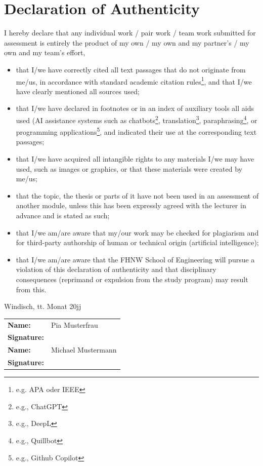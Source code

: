 \section*{Declaration of Authenticity}


I hereby declare that any individual work / pair work / team work submitted for assessment is entirely the product of my own / my own and my partner’s / my own and my team’s effort,
\begin{itemize} 
\item that I/we have correctly cited all text passages that do not originate from me/us, in accordance with standard academic citation rules\footnote{e.g. APA oder IEEE}, and that I/we have clearly mentioned all sources used; 
\item that I/we have declared in footnotes or in an index of auxiliary tools all aids used (AI assistance systems such as chatbots\footnote{e.g., ChatGPT}, translation\footnote{e.g., DeepL}, paraphrasing\footnote{e.g., Quillbot}, or programming applications\footnote{e.g., Github Copilot}, and indicated their use at the corresponding text passages;
\item that I/we have acquired all intangible rights to any materials I/we may have used, such as images or graphics, or that these materials were created by me/us; 
\item that the topic, the thesis or parts of it have not been used in an assessment of another module, unless this has been expressly agreed with the lecturer in advance and is stated as such;
\item that I/we am/are aware that my/our work may be checked for plagiarism and for third-party authorship of human or technical origin (artificial intelligence); 
\item that I/we am/are aware that the FHNW School of Engineering will pursue a violation of this declaration of authenticity and that disciplinary consequences (reprimand or expulsion from the study program) may result from this.
\end{itemize}

\vspace*{4ex}

Windisch, tt. Monat 20jj

\vspace*{4ex}

{\renewcommand{\arraystretch}{2}
\begin{tabular}{@{}>{\bf}ll}
Name: & Pia Musterfrau\\
Signature: & \\[6ex]
Name: & Michael Mustermann\\
Signature: & \\
\end{tabular}}